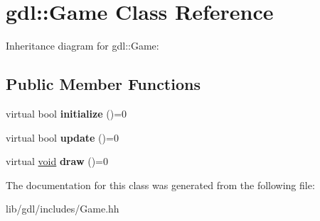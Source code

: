 \hypertarget{classgdl_1_1_game}{}\section{gdl\+:\+:Game Class Reference}
\label{classgdl_1_1_game}


Inheritance diagram for gdl\+:\+:Game\+:
\subsection*{Public Member Functions}
\begin{DoxyCompactItemize}
\item 
\hypertarget{classgdl_1_1_game_aecd7b2ddca26bdea632cd2f7a0dc7b49}{}virtual bool {\bfseries initialize} ()=0\label{classgdl_1_1_game_aecd7b2ddca26bdea632cd2f7a0dc7b49}

\item 
\hypertarget{classgdl_1_1_game_a48f421b3d96140732cf028057feca989}{}virtual bool {\bfseries update} ()=0\label{classgdl_1_1_game_a48f421b3d96140732cf028057feca989}

\item 
\hypertarget{classgdl_1_1_game_a3de59c743de1fc51cc464f0d47514ffa}{}virtual \hyperlink{_s_d_l__audio_8h_a52835ae37c4bb905b903cbaf5d04b05f}{void} {\bfseries draw} ()=0\label{classgdl_1_1_game_a3de59c743de1fc51cc464f0d47514ffa}

\end{DoxyCompactItemize}


The documentation for this class was generated from the following file\+:\begin{DoxyCompactItemize}
\item 
lib/gdl/includes/Game.\+hh\end{DoxyCompactItemize}
